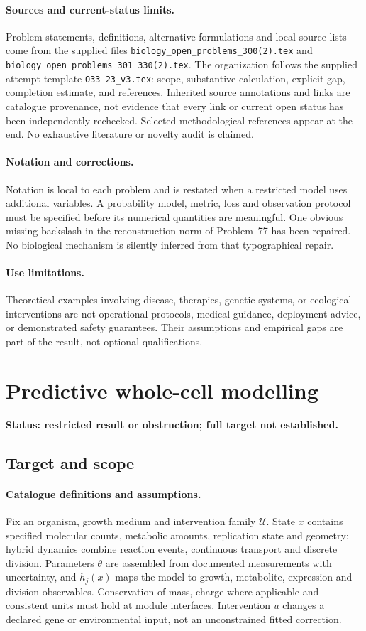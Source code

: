 \documentclass[11pt]{article}
\begin{document}
\paragraph{Sources and current-status limits.}
Problem statements, definitions, alternative formulations and local source lists
come from the supplied files
\texttt{biology\_open\_problems\_300(2).tex} and
\texttt{biology\_open\_problems\_301\_330(2).tex}.
The organization follows the supplied attempt template
\texttt{O33-23\_v3.tex}: scope, substantive calculation, explicit gap,
completion estimate, and references. Inherited source annotations and links are
catalogue provenance, not evidence that every link or current open status has
been independently rechecked. Selected methodological references appear at the
end. No exhaustive literature or novelty audit is claimed.

\paragraph{Notation and corrections.}
Notation is local to each problem and is restated when a restricted model uses
additional variables. A probability model, metric, loss and observation protocol
must be specified before its numerical quantities are meaningful. One obvious
missing backslash in the reconstruction norm of Problem~77 has been repaired.
No biological mechanism is silently inferred from that typographical repair.

\paragraph{Use limitations.}
Theoretical examples involving disease, therapies, genetic systems, or ecological
interventions are not operational protocols, medical guidance, deployment advice,
or demonstrated safety guarantees. Their assumptions and empirical gaps are part
of the result, not optional qualifications.


\section*{Predictive whole-cell modelling}
\label{prob:041}
\noindent\textbf{Status: restricted result or obstruction; full target not established.}
\subsection{Target and scope}
\paragraph{Catalogue definitions and assumptions.}
Fix an organism, growth medium and intervention family $\mathcal U$. State $x$ contains specified molecular counts, metabolic amounts, replication state and geometry; hybrid dynamics combine reaction events, continuous transport and discrete division. Parameters $\theta$ are assembled from documented measurements with uncertainty, and $h_j(x)$ maps the model to growth, metabolite, expression and division observables. Conservation of mass, charge where applicable and consistent units must hold at module interfaces. Intervention $u$ changes a declared gene or environmental input, not an unconstrained fitted correction.
\end{document}
